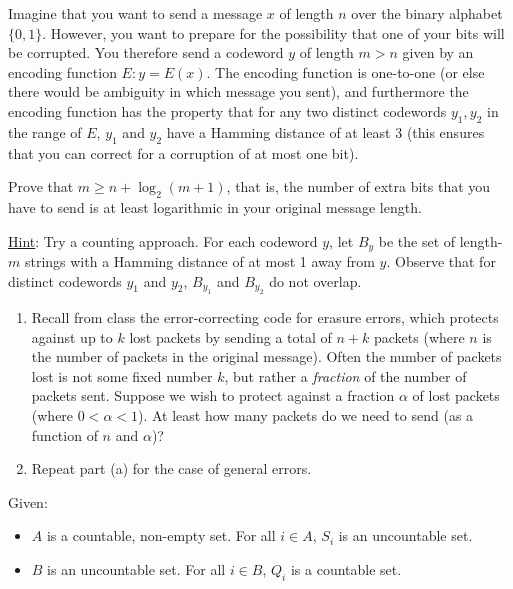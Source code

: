 Imagine that you want to send a message $x$ of length $n$ over the binary alphabet $\{0, 1\}$. However, you want to prepare for the possibility that one of your bits will be corrupted. You therefore send a codeword $y$ of length $m > n$ given by an encoding function $E: y = E(x)$. The encoding function is one-to-one (or else there would be ambiguity in which message you sent), and furthermore the encoding function has the property that for any two distinct codewords $y_1, y_2$ in the range of $E$, $y_1$ and $y_2$ have a Hamming distance of at least 3 (this ensures that you can correct for a corruption of at most one bit).

Prove that $m \ge n + \log_2(m+1)$, that is, the number of extra bits that you have to send is at least logarithmic in your original message length.

\underline{Hint}: Try a counting approach. For each codeword $y$, let $B_y$ be the set of length-$m$ strings with a Hamming distance of at most 1 away from $y$. Observe that for distinct codewords $y_1$ and $y_2$, $B_{y_1}$ and $B_{y_2}$ do not overlap.



\begin{enumerate}
\renewcommand{\labelenumi}{(\alph{enumi})}
\item 
Recall from class the error-correcting code for erasure errors, which
protects against up to $k$ lost packets by sending a total of $n+k$ packets
(where $n$ is the number of packets in the original message).  Often the number
of packets lost is not some fixed number $k$, but rather a \emph{fraction} of
the number of packets sent.  Suppose we wish to protect against a fraction
$\alpha$ of lost packets (where $0 < \alpha < 1$).  At least how many packets do 
we need to send (as a function of $n$ and $\alpha$)?

\item 
Repeat part (a) for the case of general errors.

\end{enumerate}


Given:
\begin{itemize}
\item $A$ is a countable, non-empty set. For all $i \in A$, $S_i$ is an uncountable set.
\item $B$ is an uncountable set. For all $i \in B$, $Q_i$ is a countable set.
\end{itemize}

